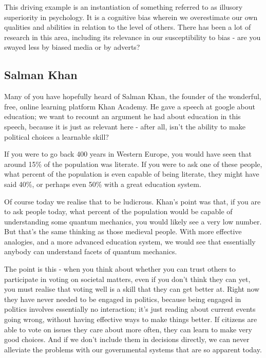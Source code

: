 \documentclass[twoside]{article}
\begin{document}
This driving example is an instantiation of something referred to as illusory superiority in psychology. It is a cognitive bias wherein we overestimate our own qualities and abilities in relation to the level of others. There has been a lot of research in this area, including its relevance in our susceptibility to bias - are you swayed less by biased media or by adverts?

\subsection{Salman Khan}

Many of you have hopefully heard of Salman Khan, the founder of the wonderful, free, online learning platform Khan Academy. He gave a speech at google about education; we want to recount an argument he had about education in this speech, because it is just as relevant here - after all, isn’t the ability to make political choices a learnable skill?

If you were to go back 400 years in Western Europe, you would have seen that around 15\% of the population was literate. If you were to ask one of these people, what percent of the population is even capable of being literate, they might have said 40\%, or perhaps even 50\% with a great education system. 

Of course today we realise that to be ludicrous. Khan’s point was that, if you are to ask people today, what percent of the population would be capable of understanding some quantum mechanics, you would likely see a very low number. But that’s the same thinking as those medieval people. With more effective analogies, and a more advanced education system, we would see that essentially anybody can understand facets of quantum mechanics.

The point is this - when you think about whether you can trust others to participate in voting on societal matters, even if you don’t think they can yet, you must realise that voting well is a skill that they can get better at. Right now they have never needed to be engaged in politics, because being engaged in politics involves essentially no interaction; it’s just reading about current events going wrong, without having effective ways to make things better. If citizens are able to vote on issues they care about more often, they can learn to make very good choices. And if we don’t include them in decisions directly, we can never alleviate the problems with our governmental systems that are so apparent today.
\end{document}
